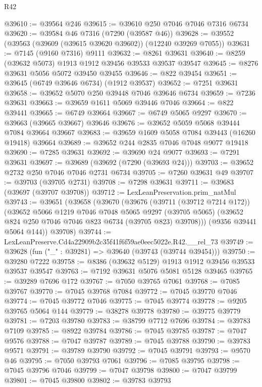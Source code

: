 \begin{lexlean}{R42}
\begin{coremodule}
{@39610 := @39564 @246
@39615 := @39610 @250 @7046 @7046 @7316 @6734
@39620 := @39584 @46 @7316 (@7290 (@39587 @46))
@39628 := @39552 (@39563 (@39609 (@39615 @39620 @39602)) (@12240 @39269 @7055))
@39631 := @7145 (@9160 @7316) @9111
@39632 := @8261 @39631
@39640 := @8259 (@39632 @5073) @1913 @1912 @39456 @39533 @39537 @39547
@39645 := @8276 @39631 @5056 @5072 @39450 @39455
@39646 := @822 @39454
@39651 := @39645 (@6749 @39646 @6734) (@1912 @39537)
@39652 := @7251 @39631
@39658 := @39652 @5070 @250 @39448 @7046 @39646 @6734
@39659 := @7236 @39631
@39663 := @39659 @1611 @5069 @39446 @7046
@39664 := @822 @39441
@39665 := @6749 @39664
@39667 := @6749 @5065 @9297
@39670 := @39663 (@39665 @39667) @39646
@39676 := @39652 @5059 @5068 @39444 @7084 @39664 @39667
@39683 := @39659 @1609 @5058 @7084 @39443 (@16260 @19418) @39664
@39689 := @39652 @244 @2835 @7046 @7048 @9077 @19418
@39690 := @7285 @39631
@39692 := @39690 @24 @9077
@39693 := @7291 @39631
@39697 := @39689 (@39692 (@7290 (@39693 @24)))
@39703 := @39652 @2732 @250 @7046 @7046 @2731 @6734
@39705 := @7260 @39631 @49
@39707 := @39703 (@39705 @2731)
@39708 := @7298 @39631
@39711 := @39683 (@39697 (@39707 @39708))
@39712 := LexLeanPreservation.prim_natMul
@39743 := @39651
    (@39658
      (@39670
        (@39676
          (@39711 (@39712 @7214 @172))
          (@39652
            @5066
            @1219
            @7046
            @7048
            @5065
            @9297
            (@39705 @5065)
            (@39652 @824 @250 @7046 @7046 @823 @6734 (@39705 @823) @39708)))
        (@9356 @39441 @5064 @144))
      @39708)
@39744 := LexLeanPreserve.Cd4a22909b2c35f41f6f59ae0eec5022e.R42.__rel_73
@39749 := @39628 (fun ("_" : @39281) => @39640 (@39743 (@39744 @39454)))
@39750 := @39280 @7222
@39758 := @8386 (@39632 @5129) @1913 @1912 @39456 @39533 @39537 @39547
@39763 := @7192 @39631 @5076 @5081 @5128 @39465
@39765 := @39289 @7696 @172
@39767 := @7050 @39765 @7061
@39768 := @7085 @39767
@39770 := @7045 @39768 @7084
@39772 := @7045 @39770 @7046
@39774 := @7045 @39772 @7046
@39775 := @7045 @39774
@39778 := @9205 @39765 @5064 @144
@39779 := @38278 @39778
@39780 := @39775 @39779
@39781 := @7203 @39780
@39783 := @38799 @7712 @7696
@39784 := @39783 @7109
@39785 := @8922 @39784
@39786 := @7045 @39785
@39787 := @7047 @9576
@39788 := @7047 @39787
@39789 := @7045 @39788
@39790 := @39783 @9571
@39791 := @39789 @39790
@39792 := @7045 @39791
@39793 := @9570 @46
@39795 := @7050 @39793 @7061
@39796 := @7085 @39795
@39798 := @7045 @39796 @7046
@39799 := @7047 @39798
@39800 := @7047 @39799
@39801 := @7045 @39800
@39802 := @39783 @39793
}
\end{coremodule}
\end{lexlean}
